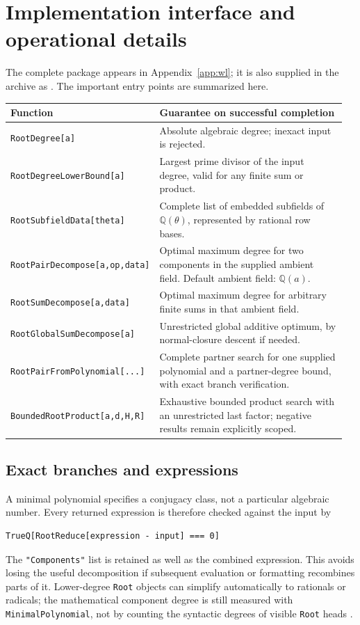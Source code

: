 \documentclass[11pt,a4paper]{article}
\newcommand{\Q}{\mathbb Q}
\newcommand{\code}[1]{\texttt{#1}}
\theoremstyle{remark}\newtheorem{remark}[theorem]{Remark}
\begin{document}
\section{Implementation interface and operational details}
\label{sec:interface}
The complete package appears in Appendix~\ref{app:wl}; it is also supplied in the archive as . The important entry points are summarized here.

\begin{longtable}{@{}p{0.37\linewidth}p{0.59\linewidth}@{}}
\toprule
\textbf{Function} & \textbf{Guarantee on successful completion}\\
\midrule\endhead
\code{RootDegree[a]} & Absolute algebraic degree; inexact input is rejected.\\[4pt]
\code{RootDegreeLowerBound[a]} & Largest prime divisor of the input degree, valid for any finite sum or product.\\[4pt]
\code{RootSubfieldData[theta]} & Complete list of embedded subfields of $\Q(\theta)$, represented by rational row bases.\\[4pt]
\code{RootPairDecompose[a,op,data]} & Optimal maximum degree for two components in the supplied ambient field. Default ambient field: $\Q(a)$.\\[4pt]
\code{RootSumDecompose[a,data]} & Optimal maximum degree for arbitrary finite sums in that ambient field.\\[4pt]
\code{RootGlobalSumDecompose[a]} & Unrestricted global additive optimum, by normal-closure descent if needed.\\[4pt]
\code{RootPairFromPolynomial[...]} & Complete partner search for one supplied polynomial and a partner-degree bound, with exact branch verification.\\[4pt]
\code{BoundedRootProduct[a,d,H,R]} & Exhaustive bounded product search with an unrestricted last factor; negative results remain explicitly scoped.\\
\bottomrule
\end{longtable}

\subsection{Exact branches and expressions}
A minimal polynomial specifies a conjugacy class, not a particular algebraic number. Every returned expression is therefore checked against the input by
\begin{lstlisting}
TrueQ[RootReduce[expression - input] === 0]
\end{lstlisting}
The \code{"Components"} list is retained as well as the combined expression. This avoids losing the useful decomposition if subsequent evaluation or formatting recombines parts of it. Lower-degree \code{Root} objects can simplify automatically to rationals or radicals; the mathematical component degree is still measured with \code{MinimalPolynomial}, not by counting the syntactic degrees of visible \code{Root} heads \cite{root}.
\end{document}
